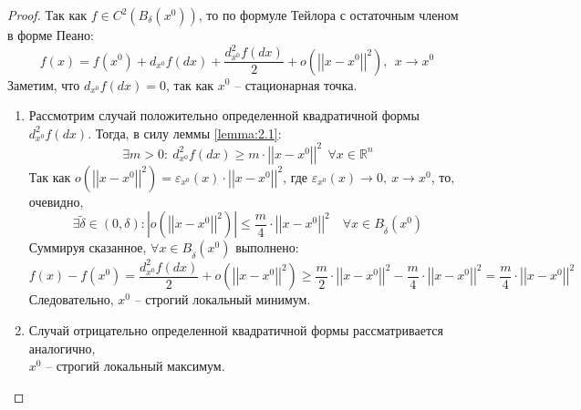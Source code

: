 \documentclass[11pt]{article}
\begin{document}
\begin{proof}
    Так как $f \in C^2(B_\delta(x^0))$, то по формуле Тейлора с остаточным членом в форме Пеано:
    \[f(x) = f(x^0) + d_{x^0}f(dx) + \frac{d^2_{x^0}f(dx)}{2} + o\left(\left|\left|x-x^0
    \right|\right|^2\right), \ \ x \to x^0\]
    Заметим, что $d_{x^0}f(dx) = 0$, так как $x^0$ -- стационарная точка.
    \begin{enumerate}
        \item Рассмотрим случай положительно определенной квадратичной формы $d^2_{x^0}f(dx)$.
        Тогда, в силу леммы \ref{lemma:2.1}:
        \[\exists m > 0: \ d^2_{x^0}f(dx) \geq m \cdot \left|\left|x - x^0\right|
        \right|^2 \ \ \forall x \in \mathbb{R}^n\]
        Так как $o\left(\left|\left|x-x^0\right|\right|^2\right) = \varepsilon_{x^0}(x) \cdot 
        \left|\left|x-x^0\right|\right|^2$, где $\varepsilon_{x^0}(x) \to 0, \ x \to x^0$,
        то, очевидно, \[\exists \widetilde{\delta} \in (0, \delta):
        \left|o\left(\left|\left|x-x^0\right|\right|^2\right)\right| \leq \frac{m}{4} \cdot \left|\left|
        x-x^0\right|\right|^2 \quad \forall x \in B_{\widetilde{\delta}}(x^0)\]
        Суммируя сказанное, $\forall x \in B_{\widetilde{\delta}}(x^0)$ выполнено:
        \[f(x) - f(x^0) = \frac{d^2_{x^0}f(dx)}{2} + o\left(\left|\left|x-x^0\right|\right|^2\right)
        \geq \frac{m}{2} \cdot \left|\left|x-x^0\right|\right|^2 - \frac{m}{4} \cdot 
        \left|\left|x-x^0\right|\right|^2 = \frac{m}{4} \cdot \left|\left|x-x^0\right|\right|^2\]
        Следовательно, $x^0$ -- строгий локальный минимум.

        \item Случай отрицательно определенной квадратичной формы рассматривается
        аналогично, \\ $x^0$ -- строгий локальный максимум.


\end{enumerate}
\end{proof}
\end{document}
